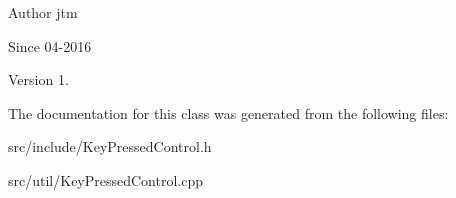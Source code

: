 \begin{DoxyAuthor}{Author}
jtm 
\end{DoxyAuthor}
\begin{DoxySince}{Since}
04-\/2016 
\end{DoxySince}
\begin{DoxyVersion}{Version}
1. 
\end{DoxyVersion}


The documentation for this class was generated from the following files\-:\begin{DoxyCompactItemize}
\item 
src/include/Key\-Pressed\-Control.\-h\item 
src/util/Key\-Pressed\-Control.\-cpp\end{DoxyCompactItemize}
